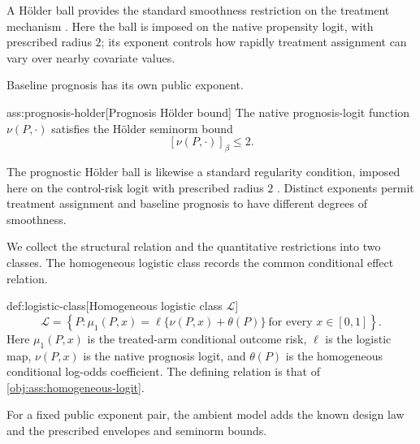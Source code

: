 A Hölder ball provides the standard smoothness restriction on the treatment mechanism \citep{RobinsTchetgenLiVanderVaart2009Minimax}. Here the ball is imposed on the native propensity logit, with prescribed radius \(2\); its exponent controls how rapidly treatment assignment can vary over nearby covariate values.

Baseline prognosis has its own public exponent.

\begin{assumptionv}{ass:prognosis-holder}[Prognosis Hölder bound]
The native prognosis-logit function \(\nu(P,\cdot)\) satisfies the Hölder seminorm bound
\[
[\nu(P,\cdot)]_\beta\le 2.
\]
\end{assumptionv}

The prognostic Hölder ball is likewise a standard regularity condition, imposed here on the control-risk logit with prescribed radius \(2\) \citep{LiuMukherjeeRobinsTchetgen2021Adaptive}. Distinct exponents permit treatment assignment and baseline prognosis to have different degrees of smoothness.

We collect the structural relation and the quantitative restrictions into two classes. The homogeneous logistic class  records the common conditional effect relation.

\begin{definitionv}{def:logistic-class}[Homogeneous logistic class \(\mathcal L\)]
\[
\mathcal L
=
\left\{
P:\mu_1(P,x)=\ell\{\nu(P,x)+\theta(P)\}
\ \text{for every }x\in[0,1]
\right\}.
\]
Here \(\mu_1(P,x)\) is the treated-arm conditional outcome risk, \(\ell\) is the logistic map, \(\nu(P,x)\) is the native prognosis logit, and \(\theta(P)\) is the homogeneous conditional log-odds coefficient. The defining relation is that of \cref{obj:ass:homogeneous-logit}.
\end{definitionv}

For a fixed public exponent pair, the ambient model  adds the known design law and the prescribed envelopes and seminorm bounds.

